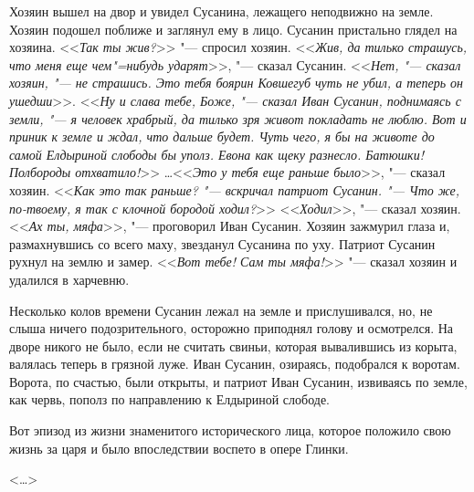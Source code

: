Хозяин вышел на двор и увидел Сусанина, лежащего неподвижно на земле. Хозяин подошел поближе и заглянул ему в лицо. Сусанин пристально глядел на хозяина. <<\textit{Так ты жив?}>> "--- спросил хозяин. <<\textit{Жив, да тилько страшусь, что меня еще чем"=нибудь ударят}>>, "--- сказал Сусанин. <<\textit{Нет, "--- сказал хозяин, "--- не страшись. Это тебя боярин Ковшегуб чуть не убил, а теперь он ушедши}>>. <<\textit{Ну и слава тебе, Боже, "--- сказал Иван Сусанин, поднимаясь с земли, "--- я человек храбрый, да тилько зря живот покладать не люблю. Вот и приник к земле и ждал, что дальше будет. Чуть чего, я бы на животе до самой Елдыриной слободы бы уполз. Евона как щеку разнесло. Батюшки! Полбороды отхватило!}>> \dots <<\textit{Это у тебя еще раньше было}>>, "--- сказал хозяин. <<\textit{Как это так раньше? "--- вскричал патриот Сусанин. "--- Что же, по-твоему, я так с клочной бородой ходил?}>> <<\textit{Ходил}>>, "--- сказал хозяин. <<\textit{Ах ты, мяфа}>>, "--- проговорил Иван Сусанин. Хозяин зажмурил глаза и, размахнувшись со всего маху, звезданул Сусанина по уху. Патриот Сусанин рухнул на землю и замер. <<\textit{Вот тебе! Сам ты мяфа!}>> "--- сказал хозяин и удалился в харчевню.

Несколько колов времени Сусанин лежал на земле и прислушивался, но, не слыша ничего подозрительного, осторожно приподнял голову и осмотрелся. На дворе никого не было, если не считать свиньи, которая вывалившись из корыта, валялась теперь в грязной луже. Иван Сусанин, озираясь, подобрался к воротам. Ворота, по счастью, были открыты, и патриот Иван Сусанин, извиваясь по земле, как червь, пополз по направлению к Елдыриной слободе.

Вот эпизод из жизни знаменитого исторического лица, которое положило свою жизнь за царя и было впоследствии воспето в опере Глинки.

\begin{flushright}
    <\dots>
\end{flushright}